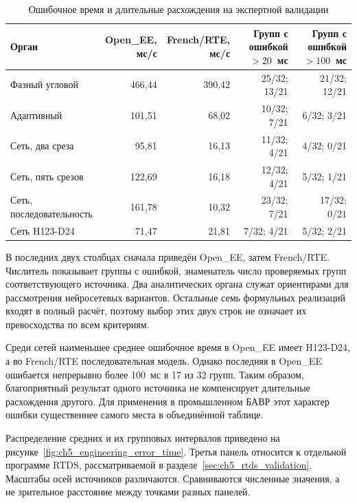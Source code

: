 \begin{table}[htbp]
\centering\small
\caption{Ошибочное время и длительные расхождения
на экспертной валидации}
\label{tab:ch5_dense_error_time}
\setlength{\tabcolsep}{4pt}
\begin{tabular}{lrrrr}
\toprule
Орган & \shortstack{Open\_EE,\\мс/с}
 & \shortstack{French/RTE,\\мс/с}
 & \shortstack{Групп с ошибкой\\$>20$~мс}
 & \shortstack{Групп с ошибкой\\$>100$~мс} \\
\midrule
Фазный угловой & 466,44 & 390,42 & 25/32; 13/21 & 21/32; 12/21 \\
Адаптивный & 101,51 & 68,02 & 10/32; 7/21 & 6/32; 3/21 \\
Сеть, два среза & 95,81 & 16,13 & 11/32; 4/21 & 4/32; 0/21 \\
Сеть, пять срезов & 122,69 & 16,18 & 12/32; 4/21 & 5/32; 1/21 \\
Сеть, последовательность & 161,78 & 10,32 & 23/32; 7/21 & 17/32; 0/21 \\
Сеть H123-D24 & 71,47 & 21,81 & 7/32; 4/21 & 5/32; 2/21 \\
\bottomrule
\end{tabular}
\end{table}

В последних двух столбцах сначала приведён Open\_EE,
затем French/RTE. Числитель показывает группы с ошибкой,
знаменатель число проверяемых групп соответствующего источника.
Два аналитических органа служат ориентирами
для рассмотрения нейросетевых вариантов.
Остальные семь формульных реализаций входят
в полный расчёт, поэтому выбор этих двух строк
не означает их превосходства по всем критериям.

Среди сетей наименьшее среднее ошибочное время
в Open\_EE имеет H123-D24,
а во French/RTE последовательная модель.
Однако последняя в Open\_EE ошибается непрерывно
более 100~мс в 17 из 32 групп.
Таким образом, благоприятный результат одного источника
не компенсирует длительные расхождения другого.
Для применения в промышленном БАВР
этот характер ошибки существеннее
самого места в объединённой таблице.

Распределение средних и их групповых интервалов
приведено на рисунке~\ref{fig:ch5_engineering_error_time}.
Третья панель относится к отдельной программе RTDS,
рассматриваемой в разделе~\ref{sec:ch5_rtds_validation}.
Масштабы осей источников различаются.
Сравниваются численные значения,
а не зрительное расстояние между точками разных панелей.

